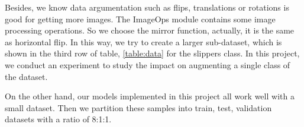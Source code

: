 Besides, we know data argumentation such as flips, translations or rotations is good for getting more images. The ImageOps module contains some image processing operations. So we choose the mirror function, actually, it is the same as horizontal flip. In this way, we try to create a larger sub-dataset, which is shown in the third row of table, \ref{table:data} for the slippers class. In this project, we conduct an experiment to study the impact on augmenting a single class of the dataset.

On the other hand, our models implemented in this project all work well with a small dataset. Then we partition these samples into train, test, validation datasets with a ratio of 8:1:1. 

